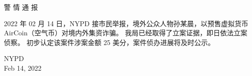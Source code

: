 \documentclass[a5paper,12pt]{article}
\title{}
\author{}
\date{}
\begin{document}
\sffamily
\pagecolor{NavyBlue!40!blue}
\color{white}
\parindent=0pt



\begin{minipage}{\linewidth}
    \Huge
    \sffamily
    \bfseries
    \center
    
    \parskip=6pt

    \vspace{12pt}

    {警 情 通 报}
\end{minipage}

\vspace{2.5em}

\rmfamily
\normalsize
\baselineskip=20pt

2022 年 02 月 14 日，NYPD 接市民举报，境外公众人物孙某晨，以预售虚拟货币 AirCoin（空气币）对境内外集资诈骗。
我局已经取得了立案证据，即日依法立案侦察。
初步认定该案件涉案金额 25 美分，案件侦办进展将及时公示。

\vspace{2.5em}
\sffamily\bfseries
\raggedright
\hspace{15em}NYPD\\
\hspace{15em}Feb 14, 2022\\
\end{document}
